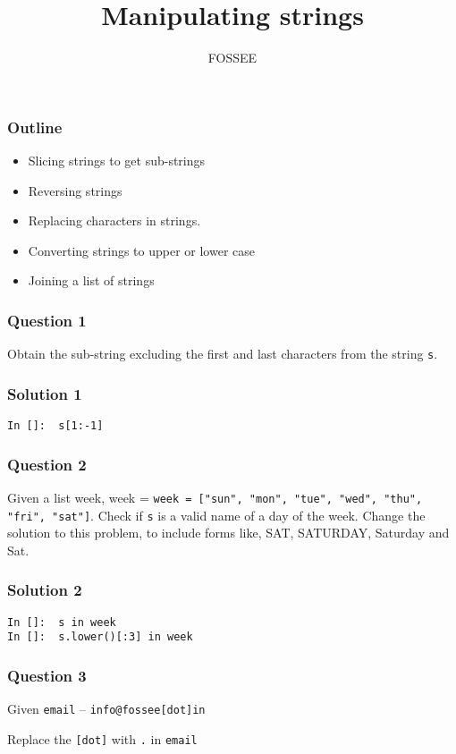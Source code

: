 \documentclass[presentation]{beamer}
\title{Manipulating strings}
\author{FOSSEE}
\date{}
\begin{document}
\maketitle









\begin{frame}
\frametitle{Outline}
\label{sec-1}

\begin{itemize}
\item Slicing strings to get sub-strings
\item Reversing strings
\item Replacing characters in strings.
\item Converting strings to upper or lower case
\item Joining a list of strings
\end{itemize}
\end{frame}
\begin{frame}
\frametitle{Question 1}
\label{sec-2}

  Obtain the sub-string excluding the first and last characters from
  the string \texttt{s}.
\end{frame}
\begin{frame}[fragile]
\frametitle{Solution 1}
\label{sec-3}

\lstset{language=Python}
\begin{lstlisting}
In []:  s[1:-1]
\end{lstlisting}
\end{frame}
\begin{frame}
\frametitle{Question 2}
\label{sec-4}

  Given a list week, week = \texttt{week = ["sun", "mon", "tue", "wed",   "thu", "fri", "sat"]}. Check if \texttt{s} is a valid name of a day of the
  week. Change the solution to this problem, to include forms like,
  SAT, SATURDAY, Saturday and Sat.
\end{frame}
\begin{frame}[fragile]
\frametitle{Solution 2}
\label{sec-5}

\lstset{language=Python}
\begin{lstlisting}
In []:  s in week
In []:  s.lower()[:3] in week
\end{lstlisting}
\end{frame}
\begin{frame}
\frametitle{Question 3}
\label{sec-6}

  Given \texttt{email} -- \texttt{info@fossee[dot]in}

  Replace the \texttt{[dot]} with \texttt{.} in \texttt{email}
\end{frame}
\end{document}
